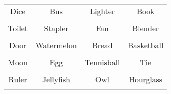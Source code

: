 \documentclass[12pt,a4paper]{article}
\begin{document}
\thispagestyle{empty}
\begin{table}[]
\centering
\Huge
\begin{tabular}{cccc}
 Dice& Bus& Lighter& Book\\  & & & \\
 Toilet& Stapler& Fan& Blender\\  & & & \\
 Door& Watermelon& Bread& Basketball\\  & & & \\
 Moon& Egg& Tennisball& Tie\\  & & & \\
 Ruler& Jellyfish& Owl& Hourglass\\  & & & \\
\end{tabular}
\end{table}
\end{document}
